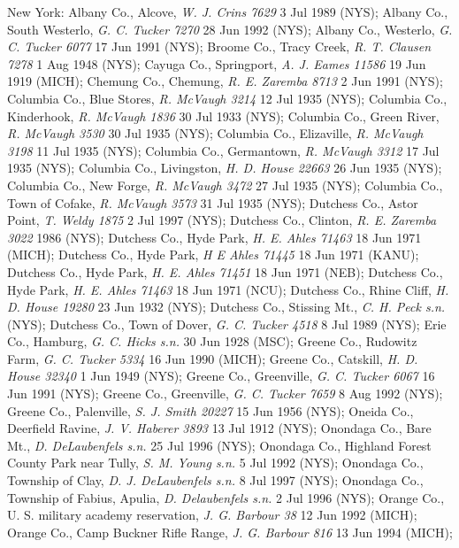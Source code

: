 \documentclass{article}
\begin{document}
New York:
Albany Co., Alcove, \textit{W. J. Crins 7629} 3 Jul 1989 (NYS);
Albany Co., South Westerlo, \textit{G. C. Tucker 7270} 28 Jun 1992 (NYS);
Albany Co., Westerlo, \textit{G. C. Tucker 6077} 17 Jun 1991 (NYS);
Broome Co., Tracy Creek, \textit{R. T. Clausen 7278} 1 Aug 1948 (NYS);
Cayuga Co., Springport, \textit{A. J. Eames 11586} 19 Jun 1919 (MICH);
Chemung Co., Chemung, \textit{R. E. Zaremba 8713} 2 Jun 1991 (NYS);
Columbia Co., Blue Stores, \textit{R. McVaugh 3214} 12 Jul 1935 (NYS);
Columbia Co., Kinderhook, \textit{R. McVaugh 1836} 30 Jul 1933 (NYS);
Columbia Co., Green River, \textit{R. McVaugh 3530} 30 Jul 1935 (NYS);
Columbia Co., Elizaville, \textit{R. McVaugh 3198} 11 Jul 1935 (NYS);
Columbia Co., Germantown, \textit{R. McVaugh 3312} 17 Jul 1935 (NYS);
Columbia Co., Livingston, \textit{H. D. House 22663} 26 Jun 1935 (NYS);
Columbia Co., New Forge, \textit{R. McVaugh 3472} 27 Jul 1935 (NYS);
Columbia Co., Town of Cofake, \textit{R. McVaugh 3573} 31 Jul 1935 (NYS);
Dutchess Co., Astor Point, \textit{T. Weldy 1875} 2 Jul 1997 (NYS);
Dutchess Co., Clinton, \textit{R. E. Zaremba 3022} 1986 (NYS);
Dutchess Co., Hyde Park, \textit{H. E. Ahles 71463} 18 Jun 1971 (MICH);
Dutchess Co., Hyde Park, \textit{H E Ahles 71445} 18 Jun 1971 (KANU);
Dutchess Co., Hyde Park, \textit{H. E. Ahles 71451} 18 Jun 1971 (NEB);
Dutchess Co., Hyde Park, \textit{H. E. Ahles 71463} 18 Jun 1971 (NCU);
Dutchess Co., Rhine Cliff, \textit{H. D. House 19280} 23 Jun 1932 (NYS);
Dutchess Co., Stissing Mt., \textit{C. H. Peck s.n.}  (NYS);
Dutchess Co., Town of Dover, \textit{G. C. Tucker 4518} 8 Jul 1989 (NYS);
Erie Co., Hamburg, \textit{G. C. Hicks s.n.} 30 Jun 1928 (MSC);
Greene Co., Rudowitz Farm, \textit{G. C. Tucker 5334} 16 Jun 1990 (MICH);
Greene Co., Catskill, \textit{H. D. House 32340} 1 Jun 1949 (NYS);
Greene Co., Greenville, \textit{G. C. Tucker 6067} 16 Jun 1991 (NYS);
Greene Co., Greenville, \textit{G. C. Tucker 7659} 8 Aug 1992 (NYS);
Greene Co., Palenville, \textit{S. J. Smith 20227} 15 Jun 1956 (NYS);
Oneida Co., Deerfield Ravine, \textit{J. V. Haberer 3893} 13 Jul 1912 (NYS);
Onondaga Co., Bare Mt., \textit{D. DeLaubenfels s.n.} 25 Jul 1996 (NYS);
Onondaga Co., Highland Forest County Park near Tully, \textit{S. M. Young s.n.} 5 Jul 1992 (NYS);
Onondaga Co., Township of Clay, \textit{D. J. DeLaubenfels s.n.} 8 Jul 1997 (NYS);
Onondaga Co., Township of Fabius, Apulia, \textit{D. Delaubenfels s.n.} 2 Jul 1996 (NYS);
Orange Co., U. S. military academy reservation, \textit{J. G. Barbour 38} 12 Jun 1992 (MICH);
Orange Co., Camp Buckner Rifle Range, \textit{J. G. Barbour 816} 13 Jun 1994 (MICH);
\end{document}
